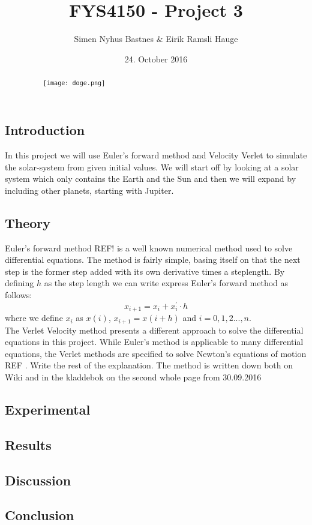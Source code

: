 \documentclass{article}
\title{FYS4150 - Project 3}
\author{Simen Nyhus Bastnes \& Eirik Ramsli Hauge}
\date{24. October 2016}
\newcommand{\husk}[1]{\color{red} #1 \color{black}}
\begin{document}
\maketitle
\begin{abstract}
\begin{figure}[H]
\centering
\texttt{[image: doge.png]}
\end{figure}
\end{abstract}
\subsection{Introduction}
In this project we will use Euler's forward method and Velocity Verlet to simulate the solar-system from given initial values. We will start off by looking at a solar system which only contains the Earth and the Sun and then we will expand by including other planets, starting with Jupiter.
\subsection{Theory}
Euler's forward method \husk{REF!} is a well known numerical method used to solve differential equations. The method is fairly simple, basing itself on that the next step is the former step added with its own derivative times a steplength. By defining $h$ as the step length we can write express Euler's forward method as follows:
\begin{equation}
x_{i + 1} = x_i + x^{'}_i \cdot h
\label{eq:fwdEuler}
\end{equation}
where we define $x_i$ as $x(i)$, $x_{i+1} = x(i + h)$ and $i = 0, 1, 2 ... , n$. \\
The Verlet Velocity method presents a different approach to solve the differential equations in this project. While Euler's method is applicable to many differential equations, the Verlet methods are specified to solve Newton's equations of motion \husk{REF}. \husk{Write the rest of the explanation. The method is written down both on Wiki and in the kladdebok on the second whole page from 30.09.2016}
\subsection{Experimental}
\subsection{Results}
\subsection{Discussion}
\subsection{Conclusion}
\end{document}
